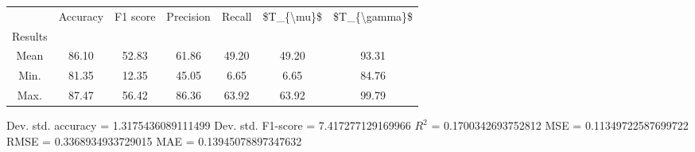\begin{tabular}{|c|c|c|c|c|c|c|}
\toprule
{} &  Accuracy &  F1 score &  Precision &  Recall &  \$T\_\{\textbackslash mu\}\$ &  \$T\_\{\textbackslash gamma\}\$ \\
Results &           &           &            &         &            &               \\
\hline
Mean    &     86.10 &     52.83 &      61.86 &   49.20 &      49.20 &         93.31 \\
Min.    &     81.35 &     12.35 &      45.05 &    6.65 &       6.65 &         84.76 \\
Max.    &     87.47 &     56.42 &      86.36 &   63.92 &      63.92 &         99.79 \\
\bottomrule
\end{tabular}

 Dev. std. accuracy = 1.3175436089111499
 Dev. std. F1-score = 7.417277129169966
 $R^2$ = 0.1700342693752812
 MSE = 0.11349722587699722
 RMSE = 0.3368934933729015
 MAE = 0.13945078897347632